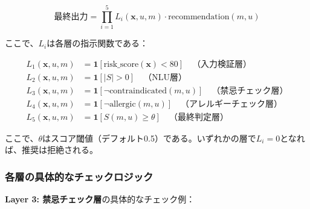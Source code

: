 \documentclass[a4paper,11pt,ja=standard,xelatex]{bxjsarticle}
\theoremstyle{definition}
\begin{document}
\begin{equation}
\text{最終出力} = \prod_{i=1}^{5} L_i(\mathbf{x}, u, m) \cdot \text{recommendation}(m, u)
\end{equation}

ここで、$L_i$は各層の指示関数である：

\begin{align}
L_1(\mathbf{x}, u, m) &= \mathbf{1}[\text{risk\_score}(\mathbf{x}) < 80] \quad \text{（入力検証層）} \\
L_2(\mathbf{x}, u, m) &= \mathbf{1}[|S| > 0] \quad \text{（NLU層）} \\
L_3(\mathbf{x}, u, m) &= \mathbf{1}[\neg \text{contraindicated}(m, u)] \quad \text{（禁忌チェック層）} \\
L_4(\mathbf{x}, u, m) &= \mathbf{1}[\neg \text{allergic}(m, u)] \quad \text{（アレルギーチェック層）} \\
L_5(\mathbf{x}, u, m) &= \mathbf{1}[S(m, u) \geq \theta] \quad \text{（最終判定層）}
\end{align}

ここで、$\theta$はスコア閾値（デフォルト0.5）である。いずれかの層で$L_i = 0$となれば、推奨は拒絶される。

\subsubsection{各層の具体的なチェックロジック}

\textbf{Layer 3: 禁忌チェック層}の具体的なチェック例：
\end{document}

